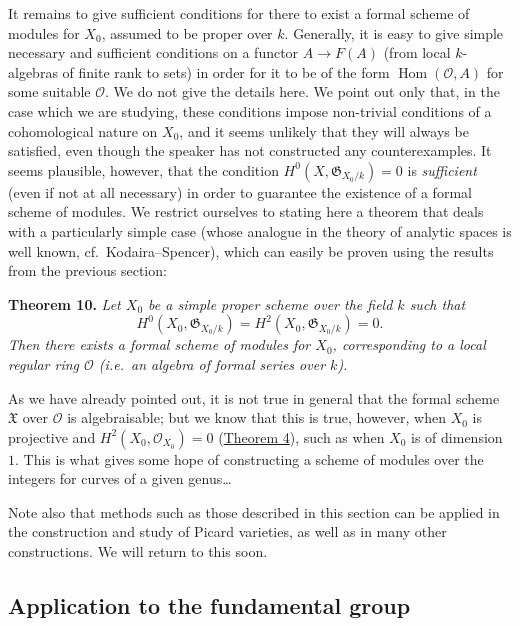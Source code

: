 \documentclass{article}
\newenvironment{itenv}[1]
  {\phantomsection\par\smallskip\noindent\textbf{#1.}\itshape}
  {\par\smallskip}
\newcommand{\oldpage}[1]{\marginpar{\footnotesize$\Big\vert$ \textit{p.~#1}}}
\theoremstyle{definition}
\theoremstyle{definition}
\theoremstyle{definition}
\theoremstyle{definition}
\theoremstyle{remark}
\begin{document}
\oldpage{182-17}It remains to give sufficient conditions for there to exist a formal scheme of modules for \(X_0\), assumed to be proper over \(k\).
Generally, it is easy to give simple necessary and sufficient conditions on a functor \(A\to F(A)\) (from local \(k\)-algebras of finite rank to sets) in order for it to be of the form \(\operatorname{Hom}({\mathcal{O}},A)\) for some suitable \({\mathcal{O}}\).
We do not give the details here.
We point out only that, in the case which we are studying, these conditions impose non-trivial conditions of a cohomological nature on \(X_0\), and it seems unlikely that they will always be satisfied, even though the speaker has not constructed any counterexamples.
It seems plausible, however, that the condition \(H^0(X,{\mathfrak{G}}_{X_0/k})=0\) is \emph{sufficient} (even if not at all necessary) in order to guarantee the existence of a formal scheme of modules.
We restrict ourselves to stating here a theorem that deals with a particularly simple case (whose analogue in the theory of analytic spaces is well known, cf.~Kodaira--Spencer), which can easily be proven using the results from the previous section:

\leavevmode{}%
\begin{itenv}{Theorem 10}
Let \(X_0\) be a simple proper scheme over the field \(k\) such that
\[
  H^0(X_0,{\mathfrak{G}}_{X_0/k}) = H^2(X_0,{\mathfrak{G}}_{X_0/k}) = 0.
\]
Then there exists a formal scheme of modules for \(X_0\), corresponding to a local regular ring \({\mathcal{O}}\) (i.e.~an algebra of formal series over \(k\)).

\end{itenv}

As we have already pointed out, it is not true in general that the formal scheme \({\mathfrak{X}}\) over \({\mathcal{O}}\) is algebraisable;
but we know that this is true, however, when \(X_0\) is projective and \(H^2(X_0,{\mathscr{O}}_{X_0})=0\) (\protect\hyperlink{fga-2-theorem-4}{Theorem 4}), such as when \(X_0\) is of dimension \(1\).
This is what gives some hope of constructing a scheme of modules over the integers for curves of a given genus\ldots{}

Note also that methods such as those described in this section can be applied in the construction and study of Picard varieties, as well as in many other constructions.
We will return to this soon.

\hypertarget{fga-2-section-8}{%
\subsection{Application to the fundamental group}\label{fga-2-section-8}}
\end{document}
